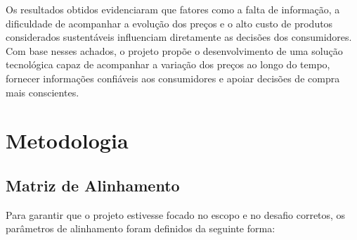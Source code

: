 \documentclass[12pt, a4paper]{article}
\newcommand{\novaSecao}[1]{\clearpage\vspace*{2.2cm}\section{#1}}
\begin{document}
Os resultados obtidos evidenciaram que fatores como a falta de informação, a dificuldade de acompanhar a evolução dos preços e o alto custo de produtos considerados sustentáveis influenciam diretamente as decisões dos consumidores. Com base nesses achados, o projeto propõe o desenvolvimento de uma solução tecnológica capaz de acompanhar a variação dos preços ao longo do tempo, fornecer informações confiáveis aos consumidores e apoiar decisões de compra mais conscientes.

\novaSecao{Metodologia}

\subsection{Matriz de Alinhamento}

Para garantir que o projeto estivesse focado no escopo e no desafio corretos, os parâmetros de alinhamento foram definidos da seguinte forma:
\end{document}

